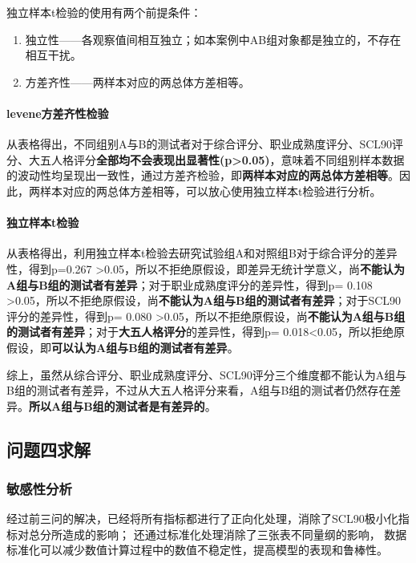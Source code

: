\documentclass[withoutpreface,bwprint]{cumcmthesis} %
\begin{document}
独立样本t检验的使用有两个前提条件：
\begin{enumerate}
    \item 独立性——各观察值间相互独立；如本案例中AB组对象都是独立的，不存在相互干扰。
    \item 方差齐性——两样本对应的两总体方差相等。
\end{enumerate}


\paragraph*{levene方差齐性检验} 从表格得出，不同组别A与B的测试者对于综合评分、职业成熟度评分、SCL90评分、大五人格评分\textbf{全部均不会表现出显著性(p>0.05)}，意味着不同组别样本数据的波动性均呈现出一致性，通过方差齐检验，即\textbf{两样本对应的两总体方差相等}。因此，两样本对应的两总体方差相等，可以放心使用独立样本t检验进行分析。

\paragraph*{独立样本t检验} 从表格得出，利用独立样本t检验去研究试验组A和对照组B对于综合评分的差异性，得到p=0.267 >0.05，所以不拒绝原假设，即差异无统计学意义，尚\textbf{不能认为A组与B组的测试者有差异}；对于职业成熟度评分的差异性，得到p= 0.108 >0.05，所以不拒绝原假设，尚\textbf{不能认为A组与B组的测试者有差异}；对于SCL90评分的差异性，得到p= 0.080 >0.05，所以不拒绝原假设，尚\textbf{不能认为A组与B组的测试者有差异}；对于\textbf{大五人格评分}的差异性，得到p= 0.018<0.05，所以拒绝原假设，即\textbf{可以认为A组与B组的测试者有差异}。

综上，虽然从综合评分、职业成熟度评分、SCL90评分三个维度都不能认为A组与B组的测试者有差异，不过从大五人格评分来看，A组与B组的测试者仍然存在差异。\textbf{所以A组与B组的测试者是有差异的}。




\subsection{问题四求解}


\subsubsection{敏感性分析}

经过前三问的解决，已经将所有指标都进行了正向化处理，消除了SCL90极小化指标对总分所造成的影响；
还通过标准化处理消除了三张表不同量纲的影响， 数据标准化可以减少数值计算过程中的数值不稳定性，提高模型的表现和鲁棒性。
\end{document}
